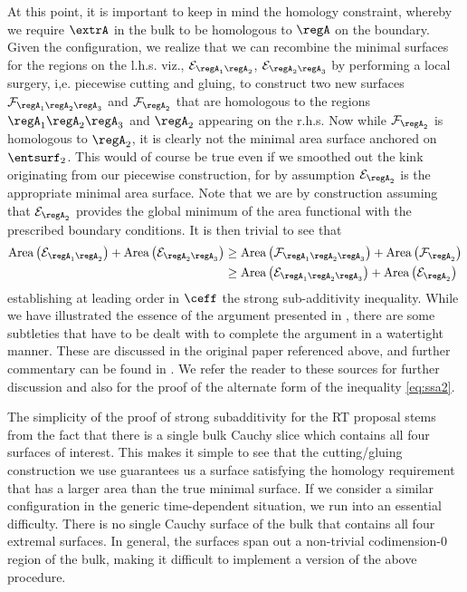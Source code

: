 \documentclass[12pt,openany]{book}
\begin{document}
At this point, it is important to keep in mind the homology constraint, whereby we require $\extrA$ in the bulk to be homologous to $\regA$ on the boundary. Given the configuration, we realize that we can recombine the minimal surfaces for the regions on the l.h.s. viz., ${\cal E}_{\regA_1\regA_2}$,  ${\cal E}_{\regA_2\regA_3}$ by performing a local surgery, i,e. piecewise cutting and gluing, to construct two new surfaces ${\cal F}_{\regA_1\regA_2\regA_3}$ and ${\cal F}_{\regA_2}$ that are homologous to the regions $\regA_1 \regA_2 \regA_3$ and $\regA_2$ appearing on the r.h.s. Now while ${\cal F} _{\regA_2}$ is homologous to $\regA_2$, it is clearly not the minimal area surface anchored on $\entsurf_2$. This would of course be true even if we smoothed out the kink originating from our piecewise construction, for by assumption
${\cal E}_{\regA_2}$ is the appropriate minimal area surface. Note that we are by construction assuming that ${\cal E}_{\regA_2}$ provides the global minimum of the area functional with the prescribed boundary conditions. It is then trivial to see that
%
\begin{equation}
\begin{split}
\text{Area}\left({\cal E}_{\regA_1\regA_2}\right) + \text{Area}\left({\cal E}_{\regA_2\regA_3}\right)
& \geq
\text{Area}\left({\cal F}_{\regA_1\regA_2\regA_3}\right) + \text{Area}\left({\cal F}_{\regA_2}\right)
 \\
&\geq
\text{Area}\left({\cal E}_{\regA_1\regA_2\regA_3}\right) + \text{Area}\left({\cal E}_{\regA_2}\right)
\end{split}
\label{}
\end{equation}
%
establishing at leading order in $\ceff$ the strong sub-additivity inequality. While we have illustrated the essence of the argument presented in \cite{Headrick:2007km}, there are some subtleties that have to be dealt with to complete the argument in a watertight manner. These are discussed in the original paper referenced above, and further commentary can be found in \cite{Headrick:2013zda}. We refer the reader to these sources for further discussion and also for the proof of the alternate form of the inequality \eqref{eq:ssa2}.

The simplicity of the proof of  strong subadditivity for the RT proposal stems from the fact that there is a single bulk Cauchy slice which contains all four surfaces of interest. This makes it simple to see that the cutting/gluing construction we use guarantees us a surface satisfying the homology requirement that has a larger area than the true minimal surface.
If we consider a similar configuration in the generic time-dependent situation, we run into an essential difficulty. There is no single Cauchy surface of the bulk that contains all four extremal surfaces. In general, the surfaces span out a non-trivial codimension-0 region of the bulk, making it difficult to implement a version of the above procedure.
\end{document}
